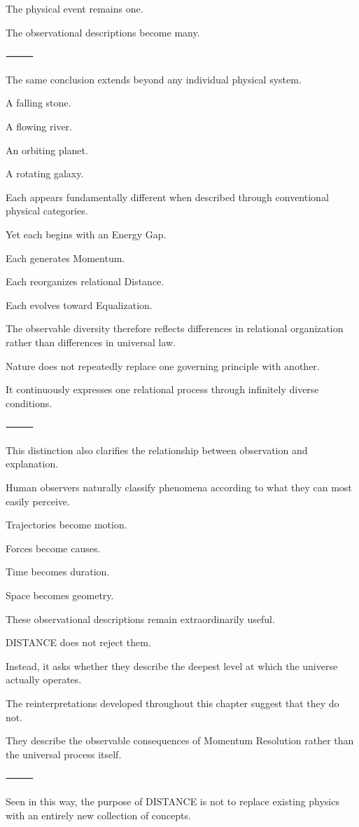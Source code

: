 The physical event remains one.

The observational descriptions become many.

⸻

The same conclusion extends beyond any individual physical system.

A falling stone.

A flowing river.

An orbiting planet.

A rotating galaxy.

Each appears fundamentally different when described through conventional physical categories.

Yet each begins with an Energy Gap.

Each generates Momentum.

Each reorganizes relational Distance.

Each evolves toward Equalization.

The observable diversity therefore reflects differences in relational organization rather than differences in universal law.

Nature does not repeatedly replace one governing principle with another.

It continuously expresses one relational process through infinitely diverse conditions.

⸻

This distinction also clarifies the relationship between observation and explanation.

Human observers naturally classify phenomena according to what they can most easily perceive.

Trajectories become motion.

Forces become causes.

Time becomes duration.

Space becomes geometry.

These observational descriptions remain extraordinarily useful.

DISTANCE does not reject them.

Instead, it asks whether they describe the deepest level at which the universe actually operates.

The reinterpretations developed throughout this chapter suggest that they do not.

They describe the observable consequences of Momentum Resolution rather than the universal process itself.

⸻

Seen in this way, the purpose of DISTANCE is not to replace existing physics with an entirely new collection of concepts.

